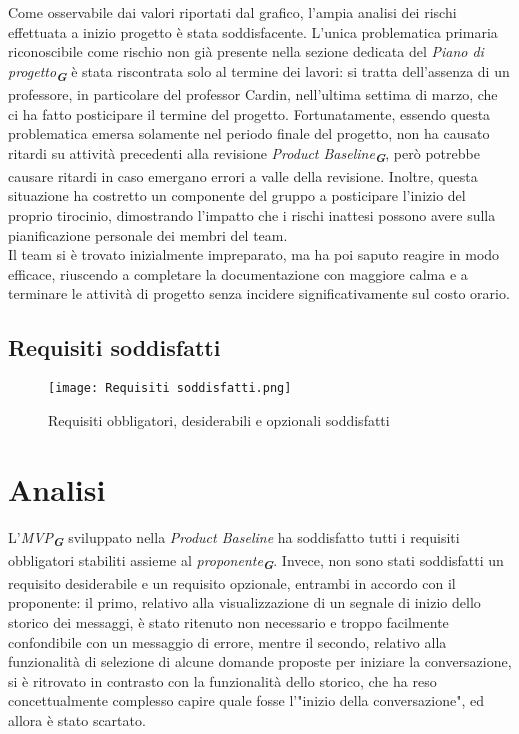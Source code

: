 Come osservabile dai valori riportati dal grafico, l’ampia analisi dei rischi effettuata a inizio progetto è stata soddisfacente. 
L'unica problematica primaria riconoscibile come rischio non già presente nella sezione dedicata del \emph{Piano di progetto}\textsubscript{\textbf{\textit{G}}} è stata riscontrata solo al termine dei lavori: 
si tratta dell'assenza di un professore, in particolare del professor Cardin, nell'ultima settima di marzo, che ci ha fatto posticipare il termine del progetto. 
Fortunatamente, essendo questa problematica emersa solamente nel periodo finale del progetto, non ha causato ritardi su attività precedenti alla revisione \emph{Product Baseline}\textsubscript{\textbf{\textit{G}}}, 
però potrebbe causare ritardi in caso emergano errori a valle della revisione.
Inoltre, questa situazione ha costretto un componente del gruppo a posticipare l'inizio del proprio tirocinio, dimostrando l'impatto che i rischi inattesi possono avere sulla pianificazione personale dei membri del team.\\
Il team si è trovato inizialmente impreparato, ma ha poi saputo reagire in modo efficace, 
riuscendo a completare la documentazione con maggiore calma e a terminare le attività di progetto 
senza incidere significativamente sul costo orario.



\newpage

\subsection{Requisiti soddisfatti}
\label{subsec:Requisiti soddisfatti}

\begin{figure}[h] 
    \centering
    \texttt{[image: Requisiti soddisfatti.png]}
    \caption{Requisiti obbligatori, desiderabili e opzionali soddisfatti} 
    \label{fig: Requisiti soddisfatti}
\end{figure}

\section*{Analisi}
L'\emph{MVP}\textsubscript{\textbf{\textit{G}}} sviluppato nella \emph{Product Baseline} ha soddisfatto tutti i requisiti obbligatori stabiliti assieme al \emph{proponente}\textsubscript{\textbf{\textit{G}}}. Invece, non sono stati soddisfatti un requisito desiderabile e un requisito opzionale, entrambi in accordo con il proponente: il primo, relativo alla visualizzazione di un segnale di inizio dello storico dei messaggi, è stato ritenuto non necessario e troppo facilmente confondibile con un messaggio di errore, mentre il secondo, relativo alla funzionalità di selezione di alcune domande proposte per iniziare la conversazione, si è ritrovato in contrasto con la funzionalità dello storico, che ha reso concettualmente complesso capire quale fosse l'"inizio della conversazione", ed allora è stato scartato.

